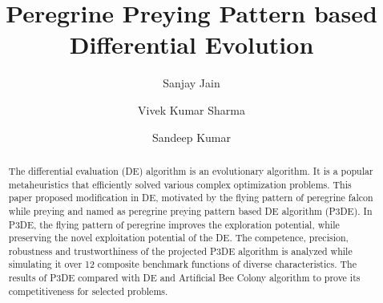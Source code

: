 \documentclass{svproc}
\begin{document}
\mainmatter              %
%
\title{Peregrine Preying Pattern based Differential Evolution}
%
%
\author{Sanjay Jain \and Vivek Kumar Sharma \and Sandeep Kumar}
%
%
%

\maketitle              %

\begin{abstract}
The differential evaluation (DE) algorithm is an evolutionary algorithm. It is a popular metaheuristics that efficiently solved various complex optimization problems. This paper proposed modification in DE, motivated by the flying pattern of peregrine falcon while preying and named as peregrine preying pattern based DE algorithm (P3DE). In P3DE, the flying pattern of peregrine improves the exploration potential, while preserving the novel exploitation potential of the DE. The competence, precision, robustness and trustworthiness of the projected P3DE algorithm is analyzed while simulating it over 12 composite benchmark functions of diverse characteristics. The results of P3DE compared with DE and Artificial Bee Colony algorithm to prove its competitiveness for selected problems.
\end{abstract}
%
\end{document}
